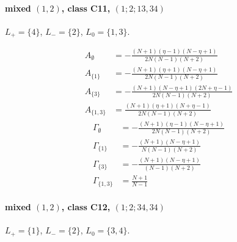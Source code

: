 \documentclass[11pt]{article}
\begin{document}
\paragraph{mixed $(1,2)$, class C11, $(1;2;13,34)$}

$L_+=\{4\}$, $L_-=\{2\}$, $L_0=\{1,3\}$.

\begin{align*}
  A_{\emptyset} &= - \frac{\left(N + 1\right) \left(\eta - 1\right) \left(N - \eta + 1\right)}{2 N \left(N - 1\right) \left(N + 2\right)} \\
  A_{\{1\}} &= - \frac{\left(N + 1\right) \left(\eta + 1\right) \left(N - \eta + 1\right)}{2 N \left(N - 1\right) \left(N + 2\right)} \\
  A_{\{3\}} &= - \frac{\left(N + 1\right) \left(N - \eta + 1\right) \left(2 N + \eta - 1\right)}{2 N \left(N - 1\right) \left(N + 2\right)} \\
  A_{\{1,3\}} &= \frac{\left(N + 1\right) \left(\eta + 1\right) \left(N + \eta - 1\right)}{2 N \left(N - 1\right) \left(N + 2\right)} 
\end{align*}
\begin{align*}
  \Gamma_{\emptyset} &= - \frac{\left(N + 1\right) \left(\eta - 1\right) \left(N - \eta + 1\right)}{2 N \left(N - 1\right) \left(N + 2\right)} \\
  \Gamma_{\{1\}} &= - \frac{\left(N + 1\right) \left(N - \eta + 1\right)}{N \left(N - 1\right) \left(N + 2\right)} \\
  \Gamma_{\{3\}} &= - \frac{\left(N + 1\right) \left(N - \eta + 1\right)}{\left(N - 1\right) \left(N + 2\right)} \\
  \Gamma_{\{1,3\}} &= \frac{N + 1}{N - 1} 
\end{align*}

\paragraph{mixed $(1,2)$, class C12, $(1;2;34,34)$}

$L_+=\{1\}$, $L_-=\{2\}$, $L_0=\{3,4\}$.
\end{document}
